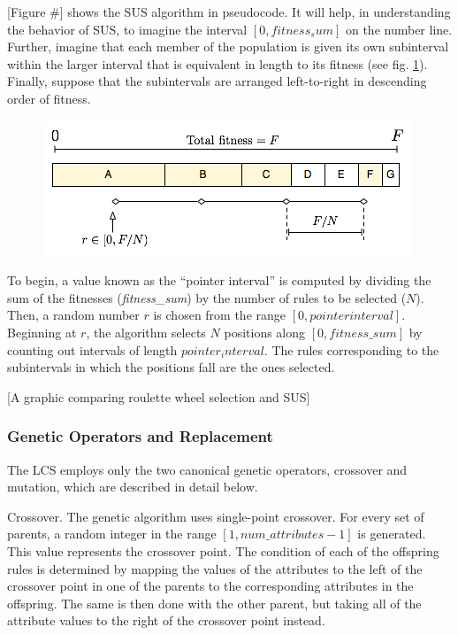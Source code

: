 \documentclass[11pt]{article}
\begin{document}
[Figure \#] shows the SUS algorithm in pseudocode. It will help, in understanding the behavior of SUS, to imagine the interval $[0, fitness_sum]$ on the number line. Further, imagine that each member of the population is given its own subinterval within the larger interval that is equivalent in length to its fitness (see fig. \ref{sus_graphic}). Finally, suppose that the subintervals are arranged left-to-right in descending order of fitness. 

\begin{figure}
\centering
\includegraphics[scale=0.7]{images/sus.png}
\caption{ }
\label{sus_graphic}
\end{figure}
To begin, a value known as the ``pointer interval'' is computed by dividing the sum of the fitnesses (\emph{fitness\_sum}) by the number of rules to be selected ($N$). Then, a random number $r$ is chosen from the range $[0, pointer interval]$. Beginning at $r$, the algorithm selects $N$ positions along $[0, fitness\_sum]$ by counting out intervals of length $pointer_interval$. The rules corresponding to the subintervals in which the positions fall are the ones selected.

[A graphic comparing roulette wheel selection and SUS]

\subsubsection*{Genetic Operators and Replacement}

The LCS employs only the two canonical genetic operators, crossover and mutation, which are described in detail below.

Crossover. The genetic algorithm uses single-point crossover. For every set of parents, a random integer in the range $[1, num\_attributes - 1]$ is generated. This value represents the crossover point. The condition of each of the offspring rules is determined by mapping the values of the attributes to the left of the crossover point in one of the parents to the corresponding attributes in the offspring. The same is then done with the other parent, but taking all of the attribute values to the right of the crossover point instead.
\end{document}
